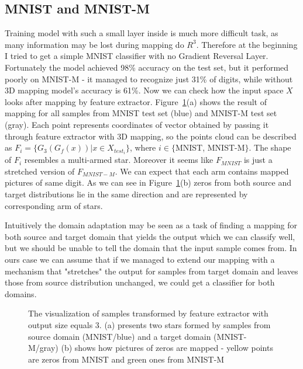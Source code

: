 \documentclass{article}
\begin{document}
\subsection{MNIST and MNIST-M}
\par
Training model with such a small layer inside is much more difficult task, as many information may be lost during mapping do ${R}^{3}$. Therefore at the beginning I tried to get a simple MNIST classifier with no Gradient Reversal Layer. Fortunately the model achieved 98\% accuracy on the test set, but it performed poorly on MNIST-M - it managed to recognize just 31\% of digits, while without 3D mapping model's accuracy is 61\%. Now we can check how the input space ${X}$ looks after mapping by feature extractor. Figure~\ref{fig:MNIST_3D}(a) shows the result of mapping for all samples from MNIST test set (blue) and MNIST-M test set (gray). Each point represents coordinates of vector obtained by passing it through feature extractor with 3D mapping, so the points cloud can be described as $F_{i} = \{G_{3}(G_{f}(x)) | x \in X_{test_{i}}\}$, where $i \in \{$MNIST, MNIST-M$\}$. The shape of ${F_{i}}$ resembles a multi-armed star. Moreover it seems like $F_{MNIST}$ is just a stretched version of $F_{MNIST-M}$. We can expect that each arm contains mapped pictures of same digit. As we can see in Figure~\ref{fig:MNIST_3D}(b) zeros from both source and target distributions lie in the same direction and are represented by corresponding arm of stars. \par
Intuitively the domain adaptation may be seen as a task of finding a mapping for both source and target domain that yields the output which we can classify well, but we should be unable to tell the domain that the input sample comes from. In ours case we can assume that if we managed to extend our mapping with a mechanism that "stretches" the output for samples from target domain and leaves those from source distribution unchanged, we could get a classifier for both domains.

\begin{figure}[htb]%
    \centering
    \qquad
    \caption{The visualization of samples transformed by feature extractor with output size equals 3. (a) presents two stars formed by samples from source domain (MNIST/blue) and a target domain (MNIST-M/gray) (b) shows how pictures of zeros are mapped - yellow points are zeros from MNIST and green ones from MNIST-M}%
    \label{fig:MNIST_3D}%
\end{figure}
\end{document}
